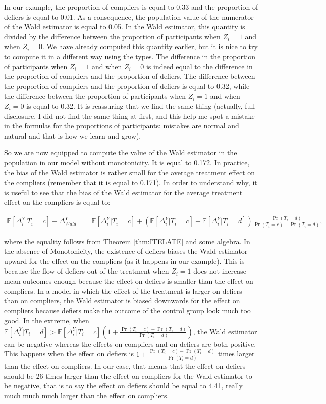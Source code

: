 \documentclass[
]{book}
\newcommand{\esp}[1]{\mathbb{E}[ #1 ]}
\theoremstyle{definition}
\theoremstyle{definition}
\theoremstyle{definition}
\theoremstyle{definition}
\theoremstyle{remark}
\begin{document}
In our example, the proportion of compliers is equal to 0.33 and the proportion of defiers is equal to 0.01.
As a consequence, the population value of the numerator of the Wald estimator is equal to 0.05.
In the Wald estimator, this quantity is divided by the difference between the proportion of participants when \(Z_i=1\) and when \(Z_i=0\).
We have already computed this quantity earlier, but it is nice to try to compute it in a different way using the types.
The difference in the proportion of participants when \(Z_i=1\) and when \(Z_i=0\) is indeed equal to the difference in the proportion of compliers and the proportion of defiers.
The difference between the proportion of compliers and the proportion of defiers is equal to 0.32, while the difference between the proportion of participants when \(Z_i=1\) and when \(Z_i=0\) is equal to 0.32.
It is reassuring that we find the same thing (actually, full disclosure, I did not find the same thing at first, and this help me spot a mistake in the formulas for the proportions of participants: mistakes are normal and natural and that is how we learn and grow).

So we are now equipped to compute the value of the Wald estimator in the population in our model without monotonicity.
It is equal to 0.172.
In practice, the bias of the Wald estimator is rather small for the average treatment effect on the compliers (remember that it is equal to 0.171).
In order to understand why, it is useful to see that the bias of the Wald estimator for the average treatment effect on the compliers is equal to:

\begin{align*}
  \esp{\Delta_i^Y|T_i=c}-\Delta^Y_{Wald} & = \esp{\Delta_i^Y|T_i=c} + (\esp{\Delta_i^Y|T_i=c}-\esp{\Delta_i^Y|T_i=d})\frac{\Pr(T_i=d)}{\Pr(T_i=c)-\Pr(T_i=d)},
\end{align*}

where the equality follows from Theorem \ref{thm:ITELATE} and some algebra.
In the absence of Monotonicity, the existence of defiers biases the Wald estimator upward for the effect on the compliers (as it happens in our example).
This is because the flow of defiers out of the treatment when \(Z_i=1\) does not increase mean outcomes enough because the effect on defiers is smaller than the effect on compliers.
In a model in which the effect of the treatment is larger on defiers than on compliers, the Wald estimator is biased downwards for the effect on compliers because defiers make the outcome of the control group look much too good.
In the extreme, when \(\esp{\Delta_i^Y|T_i=d}>\esp{\Delta_i^Y|T_i=c}(1+\frac{\Pr(T_i=c)-\Pr(T_i=d)}{\Pr(T_i=d)})\), the Wald estimator can be negative whereas the effects on compliers and on defiers are both positive.
This happens when the effect on defiers is \(1+\frac{\Pr(T_i=c)-\Pr(T_i=d)}{\Pr(T_i=d)}\) times larger than the effect on compliers.
In our case, that means that the effect on defiers should be 26 times larger than the effect on compliers for the Wald estimator to be negative, that is to say the effect on defiers should be equal to 4.41, really much much much larger than the effect on compliers.
\end{document}
